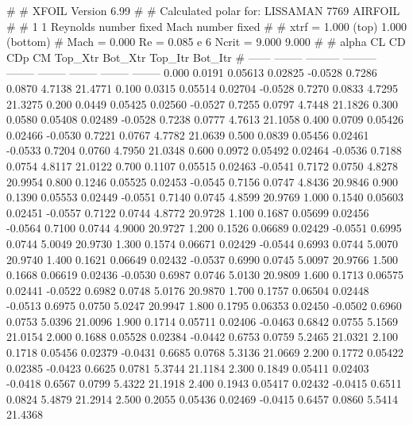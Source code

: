 #  
#       XFOIL         Version 6.99
#  
# Calculated polar for: LISSAMAN 7769 AIRFOIL                           
#  
# 1 1 Reynolds number fixed          Mach number fixed         
#  
# xtrf =   1.000 (top)        1.000 (bottom)  
# Mach =   0.000     Re =     0.085 e 6     Ncrit =   9.000  9.000
#  
#   alpha    CL        CD       CDp       CM     Top_Xtr  Bot_Xtr  Top_Itr  Bot_Itr
#  ------ -------- --------- --------- -------- -------- -------- -------- --------
   0.000   0.0191   0.05613   0.02825  -0.0528   0.7286   0.0870   4.7138  21.4771
   0.100   0.0315   0.05514   0.02704  -0.0528   0.7270   0.0833   4.7295  21.3275
   0.200   0.0449   0.05425   0.02560  -0.0527   0.7255   0.0797   4.7448  21.1826
   0.300   0.0580   0.05408   0.02489  -0.0528   0.7238   0.0777   4.7613  21.1058
   0.400   0.0709   0.05426   0.02466  -0.0530   0.7221   0.0767   4.7782  21.0639
   0.500   0.0839   0.05456   0.02461  -0.0533   0.7204   0.0760   4.7950  21.0348
   0.600   0.0972   0.05492   0.02464  -0.0536   0.7188   0.0754   4.8117  21.0122
   0.700   0.1107   0.05515   0.02463  -0.0541   0.7172   0.0750   4.8278  20.9954
   0.800   0.1246   0.05525   0.02453  -0.0545   0.7156   0.0747   4.8436  20.9846
   0.900   0.1390   0.05553   0.02449  -0.0551   0.7140   0.0745   4.8599  20.9769
   1.000   0.1540   0.05603   0.02451  -0.0557   0.7122   0.0744   4.8772  20.9728
   1.100   0.1687   0.05699   0.02456  -0.0564   0.7100   0.0744   4.9000  20.9727
   1.200   0.1526   0.06689   0.02429  -0.0551   0.6995   0.0744   5.0049  20.9730
   1.300   0.1574   0.06671   0.02429  -0.0544   0.6993   0.0744   5.0070  20.9740
   1.400   0.1621   0.06649   0.02432  -0.0537   0.6990   0.0745   5.0097  20.9766
   1.500   0.1668   0.06619   0.02436  -0.0530   0.6987   0.0746   5.0130  20.9809
   1.600   0.1713   0.06575   0.02441  -0.0522   0.6982   0.0748   5.0176  20.9870
   1.700   0.1757   0.06504   0.02448  -0.0513   0.6975   0.0750   5.0247  20.9947
   1.800   0.1795   0.06353   0.02450  -0.0502   0.6960   0.0753   5.0396  21.0096
   1.900   0.1714   0.05711   0.02406  -0.0463   0.6842   0.0755   5.1569  21.0154
   2.000   0.1688   0.05528   0.02384  -0.0442   0.6753   0.0759   5.2465  21.0321
   2.100   0.1718   0.05456   0.02379  -0.0431   0.6685   0.0768   5.3136  21.0669
   2.200   0.1772   0.05422   0.02385  -0.0423   0.6625   0.0781   5.3744  21.1184
   2.300   0.1849   0.05411   0.02403  -0.0418   0.6567   0.0799   5.4322  21.1918
   2.400   0.1943   0.05417   0.02432  -0.0415   0.6511   0.0824   5.4879  21.2914
   2.500   0.2055   0.05436   0.02469  -0.0415   0.6457   0.0860   5.5414  21.4368
